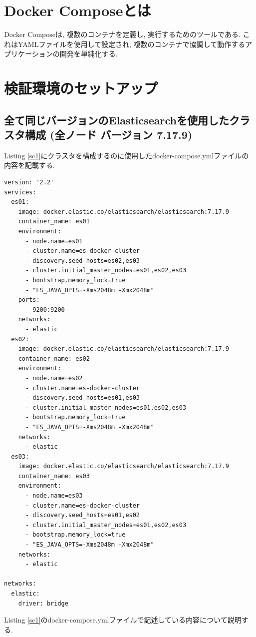 \documentclass[a4j,12pt,]{jarticle}
\begin{document}
\section{Docker Composeとは}
Docker Composeは, 複数のコンテナを定義し, 実行するためのツールである. これはYAMLファイルを使用して設定され, 複数のコンテナで協調して動作するアプリケーションの開発を単純化する.

\section{検証環境のセットアップ}
\subsection{全て同じバージョンのElasticsearchを使用したクラスタ構成 (全ノード バージョン 7.17.9)}

Listing \ref{sc1}にクラスタを構成するのに使用したdocker-compose.ymlファイルの内容を記載する.

\begin{lstlisting}[caption=全て同じバージョンのElasticsearchを使用したクラスタを構成するdocker-compose.yml, label=sc1]
version: '2.2'
services:
  es01:
    image: docker.elastic.co/elasticsearch/elasticsearch:7.17.9
    container_name: es01
    environment:
      - node.name=es01
      - cluster.name=es-docker-cluster
      - discovery.seed_hosts=es02,es03
      - cluster.initial_master_nodes=es01,es02,es03
      - bootstrap.memory_lock=true
      - "ES_JAVA_OPTS=-Xms2048m -Xmx2048m"
    ports:
      - 9200:9200
    networks:
      - elastic
  es02:
    image: docker.elastic.co/elasticsearch/elasticsearch:7.17.9
    container_name: es02
    environment:
      - node.name=es02
      - cluster.name=es-docker-cluster
      - discovery.seed_hosts=es01,es03
      - cluster.initial_master_nodes=es01,es02,es03
      - bootstrap.memory_lock=true
      - "ES_JAVA_OPTS=-Xms2048m -Xmx2048m"
    networks:
      - elastic
  es03:
    image: docker.elastic.co/elasticsearch/elasticsearch:7.17.9
    container_name: es03
    environment:
      - node.name=es03
      - cluster.name=es-docker-cluster
      - discovery.seed_hosts=es01,es02
      - cluster.initial_master_nodes=es01,es02,es03
      - bootstrap.memory_lock=true
      - "ES_JAVA_OPTS=-Xms2048m -Xmx2048m"
    networks:
      - elastic

networks:
  elastic:
    driver: bridge
\end{lstlisting}

Listing \ref{sc1}のdocker-compose.ymlファイルで記述している内容について説明する.
\end{document}
